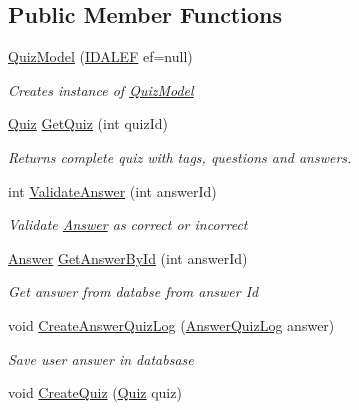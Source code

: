 \subsection*{Public Member Functions}
\begin{DoxyCompactItemize}
\item 
\hyperlink{class_website_1_1_models_1_1_quiz_model_ae9f893ec003a878e253927af5b2b789d}{Quiz\+Model} (\hyperlink{interface_website_1_1_models_1_1_i_d_a_l_e_f}{I\+D\+A\+L\+E\+F} ef=null)
\begin{DoxyCompactList}\small\item\em Creates instance of \hyperlink{class_website_1_1_models_1_1_quiz_model}{Quiz\+Model} \end{DoxyCompactList}\item 
\hyperlink{class_website_1_1_models_1_1_quiz}{Quiz} \hyperlink{class_website_1_1_models_1_1_quiz_model_aac5d921c63225e18355b611dfc3c50d2}{Get\+Quiz} (int quiz\+Id)
\begin{DoxyCompactList}\small\item\em Returns complete quiz with tags, questions and answers. \end{DoxyCompactList}\item 
int \hyperlink{class_website_1_1_models_1_1_quiz_model_a51c5924054220dd4708f38cd04ab6e7d}{Validate\+Answer} (int answer\+Id)
\begin{DoxyCompactList}\small\item\em Validate \hyperlink{class_website_1_1_models_1_1_answer}{Answer} as correct or incorrect \end{DoxyCompactList}\item 
\hyperlink{class_website_1_1_models_1_1_answer}{Answer} \hyperlink{class_website_1_1_models_1_1_quiz_model_acafe0122c954ab9233d10b68f1434e81}{Get\+Answer\+By\+Id} (int answer\+Id)
\begin{DoxyCompactList}\small\item\em Get answer from databse from answer Id \end{DoxyCompactList}\item 
void \hyperlink{class_website_1_1_models_1_1_quiz_model_ae7c4f772a694cdc69c1039941967de38}{Create\+Answer\+Quiz\+Log} (\hyperlink{class_website_1_1_models_1_1_answer_quiz_log}{Answer\+Quiz\+Log} answer)
\begin{DoxyCompactList}\small\item\em Save user answer in databsase \end{DoxyCompactList}\item 
void \hyperlink{class_website_1_1_models_1_1_quiz_model_a4c66053677b9398fe8c34b6587d59622}{Create\+Quiz} (\hyperlink{class_website_1_1_models_1_1_quiz}{Quiz} quiz)

\end{DoxyCompactItemize}
